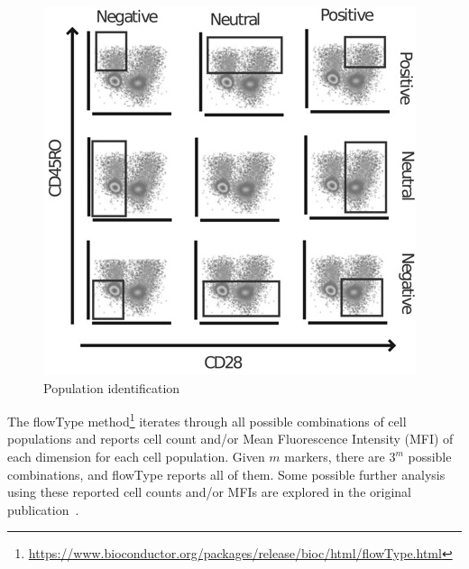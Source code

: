 \begin{figure}[!ht]
  \centering
  \includegraphics[width=.6\textwidth]{figs/flowtype/pops}
  \caption{Population identification}
  \label{fig:flowtype-pops}
\end{figure}

The flowType method\footnote{\url{https://www.bioconductor.org/packages/release/bioc/html/flowType.html}} iterates through all possible combinations of cell populations and reports cell count and/or Mean Fluorescence Intensity (MFI) of each dimension for each cell population. Given $m$ markers, there are $3^m$ possible combinations, and flowType reports all of them. Some possible further analysis using these reported cell counts and/or MFIs are explored in the original publication~\cite{Aghaeepour2012}.

